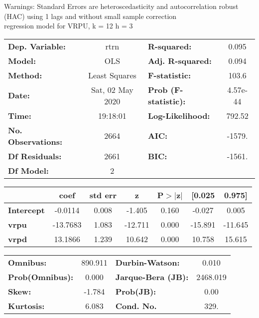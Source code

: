 Warnings: \newline
 [1] Standard Errors are heteroscedasticity and autocorrelation robust (HAC) using 1 lags and without small sample correction\\ 

regression model for VRPU, k = 12 h = 3\begin{center}
\begin{tabular}{lclc}
\toprule
\textbf{Dep. Variable:}    &       rtrn       & \textbf{  R-squared:         } &     0.095   \\
\textbf{Model:}            &       OLS        & \textbf{  Adj. R-squared:    } &     0.094   \\
\textbf{Method:}           &  Least Squares   & \textbf{  F-statistic:       } &     103.6   \\
\textbf{Date:}             & Sat, 02 May 2020 & \textbf{  Prob (F-statistic):} &  4.57e-44   \\
\textbf{Time:}             &     19:18:01     & \textbf{  Log-Likelihood:    } &    792.52   \\
\textbf{No. Observations:} &        2664      & \textbf{  AIC:               } &    -1579.   \\
\textbf{Df Residuals:}     &        2661      & \textbf{  BIC:               } &    -1561.   \\
\textbf{Df Model:}         &           2      & \textbf{                     } &             \\
\bottomrule
\end{tabular}
\begin{tabular}{lcccccc}
                   & \textbf{coef} & \textbf{std err} & \textbf{z} & \textbf{P$> |$z$|$} & \textbf{[0.025} & \textbf{0.975]}  \\
\midrule
\textbf{Intercept} &      -0.0114  &        0.008     &    -1.405  &         0.160        &       -0.027    &        0.005     \\
\textbf{vrpu}      &     -13.7683  &        1.083     &   -12.711  &         0.000        &      -15.891    &      -11.645     \\
\textbf{vrpd}      &      13.1866  &        1.239     &    10.642  &         0.000        &       10.758    &       15.615     \\
\bottomrule
\end{tabular}
\begin{tabular}{lclc}
\textbf{Omnibus:}       & 890.911 & \textbf{  Durbin-Watson:     } &    0.010  \\
\textbf{Prob(Omnibus):} &   0.000 & \textbf{  Jarque-Bera (JB):  } & 2468.019  \\
\textbf{Skew:}          &  -1.784 & \textbf{  Prob(JB):          } &     0.00  \\
\textbf{Kurtosis:}      &   6.083 & \textbf{  Cond. No.          } &     329.  \\
\bottomrule
\end{tabular}
\end{center}

